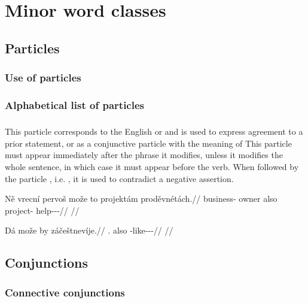 \chapter{Minor word classes}\label{chap:minor}

\section{Particles}

\subsection{Use of particles}

\subsection{Alphabetical list of particles}

\paragraph{} This particle corresponds to the English  or  and is used to express agreement to a prior statement, or as a conjunctive particle with the meaning of  This particle must appear immediately after the phrase it modifies, unless it modifies the whole sentence, in which case it must appear before the verb. When followed by the particle , i.e. , it is used to contradict a negative assertion.

\pex
\begingl
    \gla N\v{e} vrecn\'i pervo\v{s} mo\v{z}e to projekt\'am prod\v{e}vn\'et\'ach.//
    \glb \Pl{} business-\Gen{} owner also \Dem{} project-\Agt{} help-\Pv{}-\Pot{}-\Ctp{}//
    \glft {}//
\endgl
\xe

\pex
\begingl
    \gla D\'a {mo\v{z}e by} z\'a\v{c}e\v{s}tnev\'ije.//
    \glb \First{}\Sg{}.\Str{} also \Neg{}-like-\Pv{}-\Cont{}-\Quot{}//
    \glft {}//
\endgl
\xe

\section{Conjunctions}\label{sec:conj}

\subsection{Connective conjunctions}\label{sec:conn-conj}

